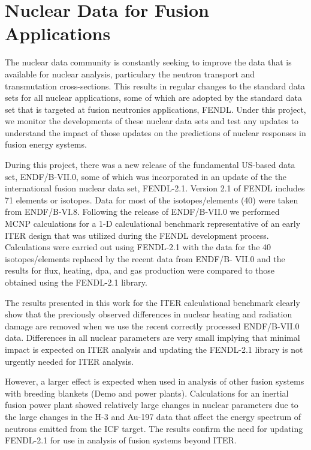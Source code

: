 \chapter{Nuclear Data for Fusion Applications}

The nuclear data community is constantly seeking to improve the data that is
available for nuclear analysis, particulary the neutron transport and
transmutation cross-sections.  This results in regular changes to the standard
data sets for all nuclear applications, some of which are adopted by the
standard data set that is targeted at fusion neutronics applications,
\gls{FENDL}.  Under this project, we monitor the developments of these nuclear
data sets and test any updates to understand the impact of those updates on
the predictions of nuclear responses in fusion energy systems.

During this project, there was a new release of the fundamental US-based data
set, ENDF/B-VII.0, some of which was incorporated in an update of the the
international fusion nuclear data set, FENDL-2.1.  Version 2.1 of \gls{FENDL}
includes 71 elements or isotopes.  Data for most of the isotopes/elements (40)
were taken from ENDF/B-VI.8. Following the release of ENDF/B-VII.0 we
performed MCNP calculations for a 1-D calculational benchmark representative
of an early ITER design that was utilized during the FENDL development
process. Calculations were carried out using FENDL-2.1 with the data for the
40 isotopes/elements replaced by the recent data from ENDF/B- VII.0 and the
results for flux, heating, dpa, and gas production were compared to those
obtained using the FENDL-2.1 library.

The results presented in this work for the ITER calculational benchmark
clearly show that the previously observed differences in nuclear heating and
radiation damage are removed when we use the recent correctly processed
ENDF/B-VII.0 data. Differences in all nuclear parameters are very small
implying that minimal impact is expected on ITER analysis and updating the
FENDL-2.1 library is not urgently needed for ITER analysis.

However, a larger effect is expected when used in analysis of other fusion
systems with breeding blankets (Demo and power plants). Calculations for an
inertial fusion power plant showed relatively large changes in nuclear
parameters due to the large changes in the H-3 and Au-197 data that affect the
energy spectrum of neutrons emitted from the ICF target. The results confirm
the need for updating FENDL-2.1 for use in analysis of fusion systems beyond
ITER.

